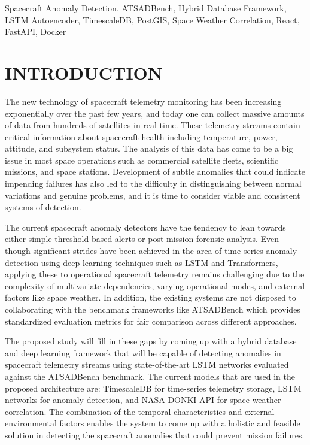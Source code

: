 \documentclass[conference]{IEEEtran}
\begin{document}
\begin{IEEEkeywords}
Spacecraft Anomaly Detection, ATSADBench, Hybrid Database Framework, LSTM Autoencoder, TimescaleDB, PostGIS, Space Weather Correlation, React, FastAPI, Docker
\end{IEEEkeywords}

\section{INTRODUCTION}

The new technology of spacecraft telemetry monitoring has been increasing exponentially over the past few years, and today one can collect massive amounts of data from hundreds of satellites in real-time. These telemetry streams contain critical information about spacecraft health including temperature, power, attitude, and subsystem status. The analysis of this data has come to be a big issue in most space operations such as commercial satellite fleets, scientific missions, and space stations. Development of subtle anomalies that could indicate impending failures has also led to the difficulty in distinguishing between normal variations and genuine problems, and it is time to consider viable and consistent systems of detection.

The current spacecraft anomaly detectors have the tendency to lean towards either simple threshold-based alerts or post-mission forensic analysis. Even though significant strides have been achieved in the area of time-series anomaly detection using deep learning techniques such as LSTM and Transformers, applying these to operational spacecraft telemetry remains challenging due to the complexity of multivariate dependencies, varying operational modes, and external factors like space weather. In addition, the existing systems are not disposed to collaborating with the benchmark frameworks like ATSADBench which provides standardized evaluation metrics for fair comparison across different approaches.

The proposed study will fill in these gaps by coming up with a hybrid database and deep learning framework that will be capable of detecting anomalies in spacecraft telemetry streams using state-of-the-art LSTM networks evaluated against the ATSADBench benchmark. The current models that are used in the proposed architecture are: TimescaleDB for time-series telemetry storage, LSTM networks for anomaly detection, and NASA DONKI API for space weather correlation. The combination of the temporal characteristics and external environmental factors enables the system to come up with a holistic and feasible solution in detecting the spacecraft anomalies that could prevent mission failures.
\end{document}
